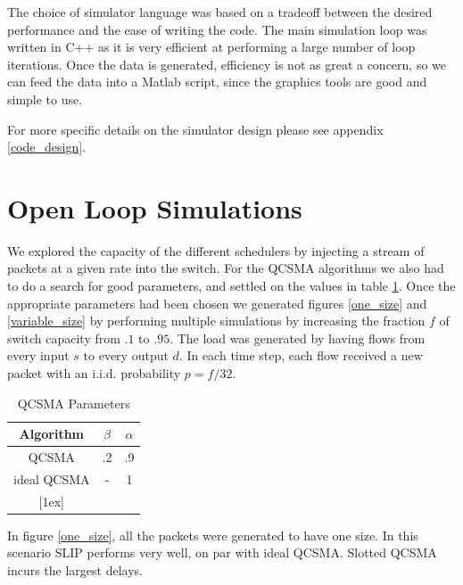 \documentclass[11pt]{article}%
\begin{document}
The choice of simulator language was based on a tradeoff between the desired performance and the ease of writing the code.  The main simulation loop was written in C++ as it is very efficient at performing a large number of loop iterations.  Once the data is generated, efficiency is not as great a concern, so we can feed the data into a Matlab script, since the graphics tools are good and simple to use. 
 
 For more specific details on the simulator design please see appendix \ref{code_design}.%
 
\section{Open Loop Simulations} \label{open}

We explored the capacity of the different schedulers by injecting a stream of packets at a given rate into the switch.  For the QCSMA algorithms we also had to do a search for good parameters, and settled on the values in table \ref{qcsma_parameters}.  Once the appropriate parameters had been chosen we generated figures \ref{one_size} and \ref{variable_size} by performing multiple simulations by increasing the fraction $f$ of switch capacity from $.1$ to $.95$.  The load was generated by having flows from every input $s$ to every output $d$.  In each time step, each flow received a new packet with an i.i.d. probability $p=f/32$.

\begin{table}[ht] \caption{QCSMA Parameters} 
\centering 
\begin{tabular}{c c c}
 \hline\hline 
 Algorithm & $\beta$ & $\alpha$ \\
  [0.5ex] \hline 
   QCSMA&.2&.9  \\
   ideal  QCSMA&-&1  \\
  [1ex] \hline 
  \end{tabular}
   \label{qcsma_parameters} 
\end{table}

In figure \ref{one_size}, all the packets were generated to have one size.  In this scenario SLIP performs very well, on par with ideal QCSMA.  Slotted QCSMA incurs the largest delays.
\end{document}
